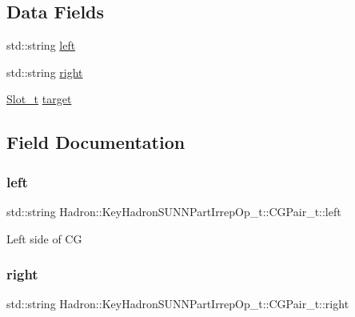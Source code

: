 \subsection*{Data Fields}
\begin{DoxyCompactItemize}
\item 
std\+::string \mbox{\hyperlink{structHadron_1_1KeyHadronSUNNPartIrrepOp__t_1_1CGPair__t_a8f95b296eb155a99d6afcc444b55bf2b}{left}}
\item 
std\+::string \mbox{\hyperlink{structHadron_1_1KeyHadronSUNNPartIrrepOp__t_1_1CGPair__t_ad7d62573bb6302d8b57772d47c34a4eb}{right}}
\item 
\mbox{\hyperlink{structHadron_1_1KeyHadronSUNNPartIrrepOp__t_1_1CGPair__t_1_1Slot__t}{Slot\+\_\+t}} \mbox{\hyperlink{structHadron_1_1KeyHadronSUNNPartIrrepOp__t_1_1CGPair__t_ab6dffdb3cf72e5c38d9a27cda160ba9c}{target}}
\end{DoxyCompactItemize}


\subsection{Field Documentation}
\mbox{\label{structHadron_1_1KeyHadronSUNNPartIrrepOp__t_1_1CGPair__t_a8f95b296eb155a99d6afcc444b55bf2b}} 
\subsubsection{\texorpdfstring{left}{left}}
{\footnotesize\ttfamily std\+::string Hadron\+::\+Key\+Hadron\+S\+U\+N\+N\+Part\+Irrep\+Op\+\_\+t\+::\+C\+G\+Pair\+\_\+t\+::left}

Left side of CG \mbox{\label{structHadron_1_1KeyHadronSUNNPartIrrepOp__t_1_1CGPair__t_ad7d62573bb6302d8b57772d47c34a4eb}} 
\subsubsection{\texorpdfstring{right}{right}}
{\footnotesize\ttfamily std\+::string Hadron\+::\+Key\+Hadron\+S\+U\+N\+N\+Part\+Irrep\+Op\+\_\+t\+::\+C\+G\+Pair\+\_\+t\+::right}

